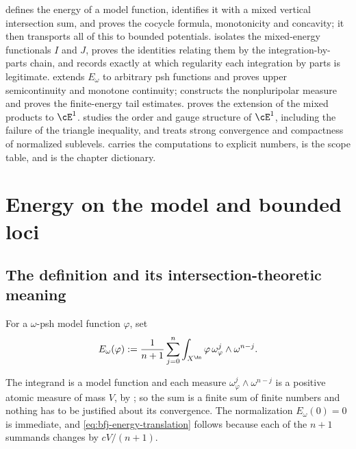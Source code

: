  defines the energy of a model function, identifies
it with a mixed vertical intersection sum, and proves the cocycle formula,
monotonicity and concavity; it then transports all of this to bounded
potentials.   isolates the mixed-energy functionals
\(I\) and \(J\), proves the identities relating them by the integration-by-parts
chain, and records exactly at which regularity each integration by parts is
legitimate.   extends \(E_\omega\) to arbitrary psh
functions and proves upper semicontinuity and monotone continuity;
 constructs the nonpluripolar measure and proves
the finite-energy tail estimates.   proves the
extension of the mixed products to \(\cE^1\).  
studies the order and gauge structure of \(\cE^1\), including the failure of
the triangle inequality, and  treats strong convergence
and compactness of normalized sublevels.   carries the
computations to explicit numbers,  is the scope table, and
 is the chapter dictionary.

\section{Energy on the model and bounded loci}
\label{sec:ch26-model-energy}

\subsection{The definition and its intersection-theoretic meaning}
\label{sec:ch26-model-energy-def}

\begin{definition}
\label{def:model-energy}
For a \(\omega\)-psh model function \(\varphi\), set
\begin{equation}
\label{eq:model-energy}
 E_\omega(\varphi)
 :=\frac1{n+1}\sum_{j=0}^n
   \int_{X^{\An}}\varphi\,
   \omega_\varphi^j\wedge\omega^{n-j}.
\end{equation}
\end{definition}

The integrand is a model function and each measure
\(\omega_\varphi^j\wedge\omega^{n-j}\) is a positive atomic measure of mass
\(V\), by ; so the sum is a finite sum of
finite numbers and nothing has to be justified about its convergence.  The
normalization \(E_\omega(0)=0\) is immediate, and
\eqref{eq:bfj-energy-translation} follows because each of the \(n+1\)
summands changes by \(cV/(n+1)\).

